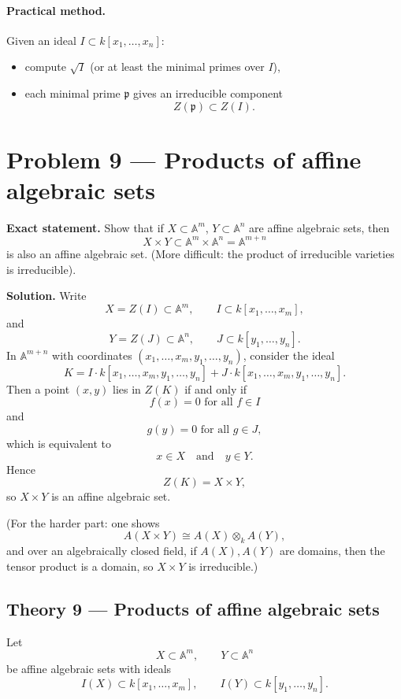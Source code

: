 \documentclass[12pt,a4paper]{article}
\theoremstyle{plain}
\theoremstyle{definition}      %
\begin{document}
\paragraph{Practical method.}
Given an ideal $I\subset k[x_1,\dots,x_n]$:
\begin{itemize}
	\item compute $\sqrt{I}$ (or at least the minimal primes over $I$),
	\item each minimal prime $\mathfrak{p}$ gives an irreducible component
	\[
	Z(\mathfrak{p})\subset Z(I).
	\]
\end{itemize}



\section*{Problem 9 — Products of affine algebraic sets}

\textbf{Exact statement.}
Show that if $X\subset \mathbb A^m$, $Y\subset \mathbb A^n$ are affine algebraic sets,
then
\[
X\times Y
\subset
\mathbb A^m\times \mathbb A^n
=
\mathbb A^{m+n}
\]
is also an affine algebraic set.
(More difficult: the product of irreducible varieties is irreducible).

\textbf{Solution.}
Write
\[
X
=
Z(I)
\subset
\mathbb A^m,
\qquad
I\subset k[x_1,\dots,x_m],
\]
and
\[
Y
=
Z(J)
\subset
\mathbb A^n,
\qquad
J\subset k[y_1,\dots,y_n].
\]
In $\mathbb A^{m+n}$ with coordinates $(x_1,\dots,x_m,y_1,\dots,y_n)$,
consider the ideal
\[
K
=
I\cdot k[x_1,\dots,x_m,y_1,\dots,y_n]
+
J\cdot k[x_1,\dots,x_m,y_1,\dots,y_n].
\]
Then a point $(x,y)$ lies in $Z(K)$ if and only if
\[
f(x)=0 \text{ for all } f\in I
\]
and
\[
g(y)=0 \text{ for all } g\in J,
\]
which is equivalent to
\[
x\in X
\quad\text{and}\quad
y\in Y.
\]
Hence
\[
Z(K)
=
X\times Y,
\]
so $X\times Y$ is an affine algebraic set.

(For the harder part: one shows
\[
A(X\times Y)
\cong
A(X)\otimes_k A(Y),
\]
and over an algebraically closed field, if $A(X),A(Y)$ are domains, then the tensor product is a domain,
so $X\times Y$ is irreducible.)


\subsection*{Theory 9 — Products of affine algebraic sets}

Let
\[
X\subset \mathbb{A}^m,
\qquad
Y\subset \mathbb{A}^n
\]
be affine algebraic sets with ideals
\[
I(X)\subset k[x_1,\dots,x_m],
\qquad
I(Y)\subset k[y_1,\dots,y_n].
\]
\end{document}
